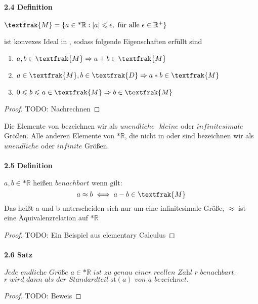 \documentclass[a4paper]{article}
\begin{document}
\paragraph{2.4 Definition} $ \textfrak{M} = \{a \in \text{*}\mathbb{R}: |a| \leqslant \epsilon, \text{ für alle } \epsilon \in \mathbb{R}^+ \} $

\bigskip
{} ist konvexes Ideal in , sodass folgende Eigenschaften erfüllt sind 
\begin{enumerate}
      \item $a,b \in \textfrak{M} \Rightarrow a + b \in \textfrak{M} $ 
      \item $a \in \textfrak{M}, b \in \textfrak{D} \Rightarrow a * b \in \textfrak{M} $ 
      \item $0 \leqslant b \leqslant a \in \textfrak{M} \Rightarrow b \in \textfrak{M} $ 
\end{enumerate}
\begin{proof}
      TODO: Nachrechnen
\end{proof}

Die Elemente von  bezeichnen wir als $ unendliche \text{ } kleine $ oder $ infinitesimale $ Größen. 
Alle anderen Elemente von *$\mathbb{R}$, die nicht in  oder  sind bezeichnen wir als $ unendliche $ oder $ infinite $ Größen.

\paragraph{2.5 Definition} $a,b \in \text{*}\mathbb{R} \text{ heißen } benachbart \text{ wenn gilt:} $
$$a \approx b \iff a - b \in \textfrak{M}$$
Das heißt a und b unterscheiden sich nur um eine infinitesimale Größe, $\approx$ ist eine Äquivalenzrelation auf *$\mathbb{R}$
\begin{proof}
      TODO: Ein Beispiel aus elementary Calculus
\end{proof}

\paragraph{2.6 Satz} $ \textit{Jede endliche Größe } a \in \text{*}\mathbb{R} \textit{ ist zu genau einer reellen Zahl r benachbart.}$
$ \textit{r wird dann als der Standardteil } \text{st}(a) \textit{ von a bezeichnet.} $
\begin{proof}
      TODO: Beweis 
\end{proof}
\end{document}
